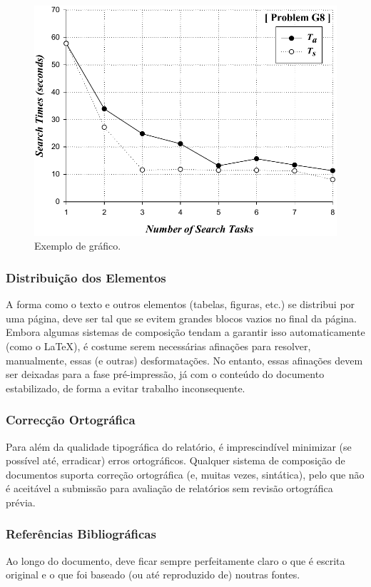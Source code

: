 \begin{figure}[htbp]
	\centering
	\includegraphics[width=0.65\linewidth]{images/search_times}
	\caption{Exemplo de gráfico.}
	\label{fig:exemplo_de_figura3}
\end{figure}

\subsubsection{Distribuição dos Elementos}
A forma como o texto e outros elementos (tabelas, figuras, etc.) se distribui por uma página, deve ser tal que se evitem grandes blocos vazios no final da página. Embora algumas sistemas de composição tendam a garantir isso automaticamente (como o LaTeX), é costume serem necessárias afinações para resolver, manualmente, essas (e outras) desformatações. No entanto, essas afinações devem ser deixadas para a fase pré-impressão, já com o conteúdo do documento estabilizado, de forma a evitar trabalho inconsequente.


\subsubsection{Correcção Ortográfica}
Para além da qualidade tipográfica do relatório, é imprescindível minimizar (se possível até, erradicar) erros ortográficos. Qualquer sistema de composição de documentos suporta correção ortográfica (e, muitas vezes, sintática), pelo que não é aceitável a submissão para avaliação de relatórios sem revisão ortográfica prévia.


\subsubsection{Referências Bibliográficas}
Ao longo do documento, deve ficar sempre perfeitamente claro o que é escrita original e o que foi baseado (ou até reproduzido de) noutras fontes. 

